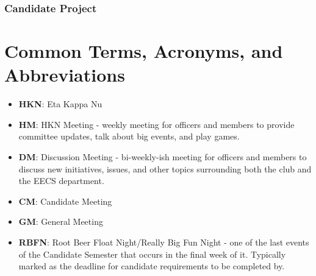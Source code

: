 \documentclass[11pt, article, oneside]{memoir}
\begin{document}
    \subsection{Candidate Project}

    
    \bigbreak
    

    \newpage
    \chapter{Common Terms, Acronyms, and Abbreviations}
    \begin{itemize}
        \item \textbf{HKN}: Eta Kappa Nu
        \item \textbf{HM}: HKN Meeting - weekly meeting for officers and members to provide committee updates, talk about big events, and play games.
        \item \textbf{DM}: Discussion Meeting - bi-weekly-ish meeting for officers and members to discuss new initiatives, issues, and other topics surrounding both the club and the EECS department.
        \item \textbf{CM}: Candidate Meeting
        \item \textbf{GM}: General Meeting
        \item \textbf{RBFN}: Root Beer Float Night/Really Big Fun Night - one of the last events of the Candidate Semester that occurs in the final week of it. Typically marked as the deadline for candidate requirements to be completed by.
    \end{itemize}
    
\end{document}
